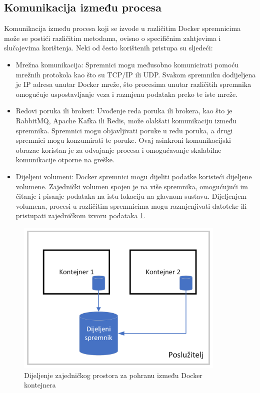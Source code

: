\documentclass[times, utf8, diplomski]{fer}
\begin{document}
\subsection{Komunikacija između procesa}

Komunikacija između procesa koji se izvode u različitim Docker spremnicima može se postići različitim metodama, ovisno o specifičnim zahtjevima i slučajevima korištenja. Neki od često korištenih pristupa su sljedeći:

\begin{itemize}
    \item Mrežna komunikacija: Spremnici mogu međusobno komunicirati pomoću mrežnih protokola kao što su TCP/IP ili UDP. Svakom spremniku dodijeljena je IP adresa unutar Docker mreže, što procesima unutar različitih spremnika omogućuje uspostavljanje veza i razmjenu podataka preko te iste mreže.
    \item Redovi poruka ili brokeri: Uvođenje reda poruka ili brokera, kao što je RabbitMQ, Apache Kafka ili Redis, može olakšati komunikaciju između spremnika. Spremnici mogu objavljivati poruke u redu poruka, a drugi spremnici mogu konzumirati te poruke. Ovaj asinkroni komunikacijski obrazac koristan je za odvajanje procesa i omogućavanje skalabilne komunikacije otporne na greške.
    \item Dijeljeni volumeni: Docker spremnici mogu dijeliti podatke koristeći dijeljene volumene. Zajednički volumen spojen je na više spremnika, omogućujući im čitanje i pisanje podataka na istu lokaciju na glavnom sustavu. Dijeljenjem volumena, procesi u različitim spremnicima mogu razmjenjivati datoteke ili pristupati zajedničkom izvoru podataka \ref{fig:docker-vol}.
\end{itemize}

\begin{figure}[htb]
\centering
\includegraphics[width=10cm]{img/com.png}
\caption{Dijeljenje zajedničkog prostora za pohranu između Docker kontejnera}
\label{fig:docker-vol}
\end{figure}
\end{document}
